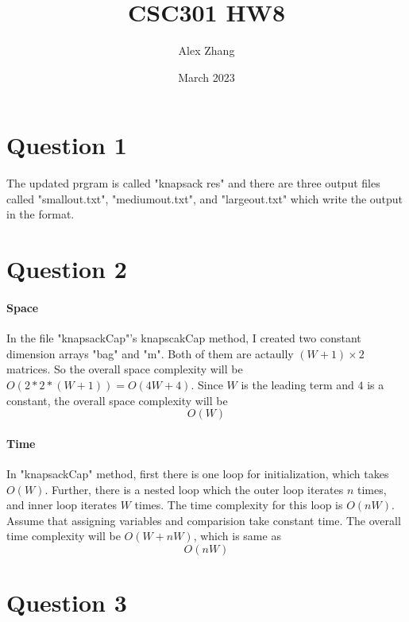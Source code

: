 \documentclass{article}
\title{CSC301 HW8}
\author{Alex Zhang}
\date{March 2023}
\begin{document}
\maketitle
\section*{Question 1}
The updated prgram is called "knapsack res" and there are three output files called 
"smallout.txt", "mediumout.txt", and "largeout.txt" which write the output in the format.

\section*{Question 2}
\paragraph{Space}

In the file "knapsackCap"'s knapscakCap method, I created two constant dimension arrays "bag"
and "m". Both of them are actaully $(W+1) \times 2$ matrices. So the overall space complexity will
be $O(2*2*(W+1)) = O(4W + 4)$. Since $W$ is the leading term and $4$ is a constant, the overall
space complexity will be
$$O(W)$$

\paragraph{Time}

In "knapsackCap" method, first there is one loop for initialization, which takes $O(W)$. Further,
there is a nested loop which the outer loop iterates $n$ times, and inner loop iterates $W$ times.
The time complexity for this loop is $O(nW)$. Assume that assigning variables and comparision take constant
time. The overall time complexity will be $O(W + nW)$, which is same as 
$$O(nW)$$




\section*{Question 3}
\end{document}
